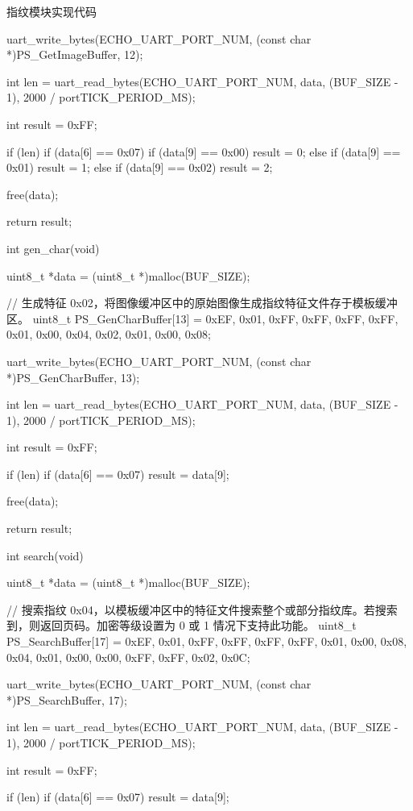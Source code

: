 \documentclass[lang=cn,newtx,10pt,scheme=chinese]{elegantbook}
\begin{document}
\begin{mycode}{指纹模块实现代码}
{    uart_write_bytes(ECHO_UART_PORT_NUM, (const char *)PS_GetImageBuffer, 12);

    int len = uart_read_bytes(ECHO_UART_PORT_NUM, data, (BUF_SIZE - 1), 2000 / portTICK_PERIOD_MS);

    int result = 0xFF;

    if (len)
    {
        if (data[6] == 0x07)
        {
            if (data[9] == 0x00)
            {
                result = 0;
            }
            else if (data[9] == 0x01)
            {
                result = 1;
            }
            else if (data[9] == 0x02)
            {
                result = 2;
            }
        }
    }

    free(data);

    return result;
}

int gen_char(void)
{
    uint8_t *data = (uint8_t *)malloc(BUF_SIZE);

    // 生成特征 0x02，将图像缓冲区中的原始图像生成指纹特征文件存于模板缓冲区。
    uint8_t PS_GenCharBuffer[13] = {0xEF, 0x01, 0xFF, 0xFF, 0xFF, 0xFF, 0x01, 0x00, 0x04, 0x02, 0x01, 0x00, 0x08};

    uart_write_bytes(ECHO_UART_PORT_NUM, (const char *)PS_GenCharBuffer, 13);

    int len = uart_read_bytes(ECHO_UART_PORT_NUM, data, (BUF_SIZE - 1), 2000 / portTICK_PERIOD_MS);

    int result = 0xFF;

    if (len)
    {
        if (data[6] == 0x07)
        {
            result = data[9];
        }
    }

    free(data);

    return result;
}

int search(void)
{
    uint8_t *data = (uint8_t *)malloc(BUF_SIZE);

    // 搜索指纹 0x04，以模板缓冲区中的特征文件搜索整个或部分指纹库。若搜索到，则返回页码。加密等级设置为 0 或 1 情况下支持此功能。
    uint8_t PS_SearchBuffer[17] = {0xEF, 0x01, 0xFF, 0xFF, 0xFF, 0xFF, 0x01, 0x00, 0x08, 0x04, 0x01, 0x00, 0x00, 0xFF, 0xFF, 0x02, 0x0C};

    uart_write_bytes(ECHO_UART_PORT_NUM, (const char *)PS_SearchBuffer, 17);

    int len = uart_read_bytes(ECHO_UART_PORT_NUM, data, (BUF_SIZE - 1), 2000 / portTICK_PERIOD_MS);

    int result = 0xFF;

    if (len)
    {
        if (data[6] == 0x07)
        {
            result = data[9];
        }
    }

}
\end{mycode}
\end{document}
